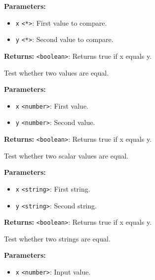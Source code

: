 \documentclass[12pt,a4paper]{article}
\begin{document}
\noindent \textbf{Parameters:}
\begin{itemize}
  \item \texttt{x} \texttt{<*>}: First value to compare.
  \item \texttt{y} \texttt{<*>}: Second value to compare.
\end{itemize}

\noindent \textbf{Returns:} \texttt{<boolean>}: Returns true if x equals y.

\noindent Test whether two values are equal.

\vspace{5mm}
\noindent {}


\noindent \textbf{Parameters:}
\begin{itemize}
  \item \texttt{x} \texttt{<number>}: First value.
  \item \texttt{y} \texttt{<number>}: Second value.
\end{itemize}

\noindent \textbf{Returns:} \texttt{<boolean>}: Returns true if x equals y.

\noindent Test whether two scalar values are equal.

\vspace{5mm}
\noindent {}


\noindent \textbf{Parameters:}
\begin{itemize}
  \item \texttt{x} \texttt{<string>}: First string.
  \item \texttt{y} \texttt{<string>}: Second string.
\end{itemize}

\noindent \textbf{Returns:} \texttt{<boolean>}: Returns true if x equals y.

\noindent Test whether two strings are equal.

\vspace{5mm}
\noindent {}


\noindent \textbf{Parameters:}
\begin{itemize}
  \item \texttt{x} \texttt{<number>}: Input value.
\end{itemize}
\end{document}
